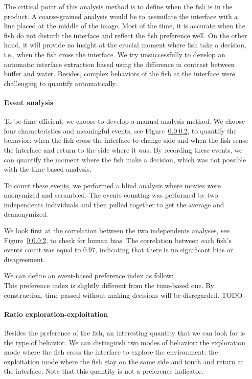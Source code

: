   The critical point of this analysis method is to define when the fish is in the product. A coarse-grained analysis would be to assimilate the interface with a line placed at the middle of the image. Most of the time, it is accurate when the fish do not disturb the interface and reflect the fish preference well. On the other hand, it will provide no insight at the crucial moment where fish take a decision, i.e., when the fish cross the interface. We try unsuccessfully to develop an automatic interface extraction based using the difference in contrast between buffer and water. Besides, complex behaviors of the fish at the interface were challenging to quantify automatically.

  \paragraph{Event analysis} To be time-efficient, we choose to develop a manual analysis method. We choose four characteristics and meaningful events, see Figure~\ref{}, to quantify the behavior: when the fish cross the interface to change side and when the fish sense the interface and return to the side where it was. By recording these events, we can quantify the moment where the fish make a decision, which was not possible with the time-based analysis.

  To count these events, we performed a blind analysis where movies were anonymized and scrambled. The events counting was performed by two independents individuals and then pulled together to get the average and deanonymized.

  We look first at the correlation between the two independents analyses, see Figure~\ref{}, to check for human bias. The correlation between each fish's events count was equal to 0.97, indicating that there is no significant bias or disagreement.

  We can define an event-based preference index as follow:
  $$
  $$
  \noindent This preference index is slightly different from the time-based one. By construction, time passed without making decisions will be disregarded. TODO

  \paragraph{Ratio exploration-exploitation} Besides the preference of the fish, an interesting quantity that we can look for is the type of behavior. We can distinguish two modes of behavior: the exploration mode where the fish cross the interface to explore the environment; the exploitation mode where the fish stay on the same side and touch and return at the interface. Note that this quantity is not a preference indicator.

